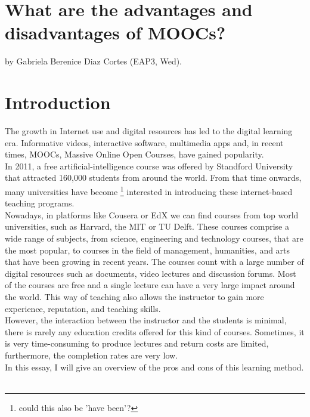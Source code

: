\documentclass[a4paper,10pt]{report}
\begin{document}
\section*{What are the advantages and disadvantages of MOOCs?}
by Gabriela Berenice Diaz Cortes (EAP3, Wed).
\section*{Introduction}
The growth in Internet use and digital resources has led to the digital learning era. 
Informative videos, interactive software, multimedia apps and, in recent times, MOOCs, 
Massive Online Open Courses, have gained popularity.\\
In 2011, a free artificial-intelligence course was offered by Standford University that attracted
160,000 students from around the world. From that time onwards, many universities have become \footnote{could this
also be 'have been'?} interested in 
introducing these internet-based teaching programs\cite{waldrop13}.\\
Nowadays, in platforms like Cousera or EdX we can find courses from top world universities,
such as Harvard, the MIT or TU Delft. 
These courses comprise a wide range of subjects, from science, engineering and technology courses, that
are the most popular, to courses in the field of management, humanities, and arts that have been growing in recent years.
The courses count with a large number of digital resources such as documents, video lectures and discussion forums. 
Most of the courses are free and a single lecture can 
have a very large impact around the world. This way of teaching also allows the instructor to gain 
more experience, reputation, and teaching skills. \\
However, the interaction between the instructor and the students is minimal, there is rarely any education
credits offered for this kind of courses. Sometimes, it is very time-consuming to produce lectures and 
return costs are limited, furthermore, the completion rates are very low\cite{stark14}. \\
In this essay, I will give an overview of the pros and cons of this learning method.\\\\
\end{document}
